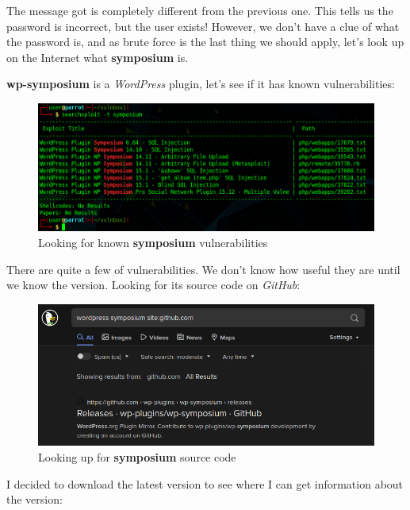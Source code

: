 \documentclass[12pt]{article}
\begin{document}
    The message got is completely different from the previous one. This tells
    us the password is incorrect, but the user exists! However, we don't have a
    clue of what the password is, and as brute force is the last thing we
    should apply, let's look up on the Internet what \textbf{symposium} is.

    \textbf{wp-symposium} is a \textit{WordPress} plugin, let's see if it has
    known vulnerabilities:

    \begin{figure}[H]\label{pic:16-searchsploit-symposium}
        \centering
        \includegraphics[width=1.00\textwidth]{16-searchsploit-symposium.png}
        \caption{Looking for known \textbf{symposium} vulnerabilities}
    \end{figure}

    There are quite a few of vulnerabilities. We don't know how useful they are
    until we know the version. Looking for its source code on \textit{GitHub}:

    \begin{figure}[H]\label{pic:17-ddg-symposium-github}
        \centering
        \includegraphics[width=1.00\textwidth]{17-ddg-symposium-github.png}
        \caption{Looking up for \textbf{symposium} source code}
    \end{figure}

    I decided to download the latest version to see where I can get information
    about the version:
\end{document}
